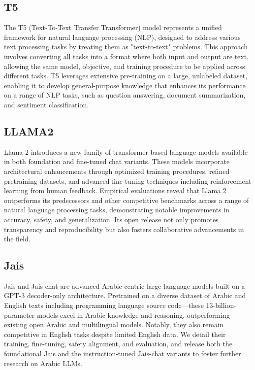 \subsection{T5}
The T5 (Text-To-Text Transfer Transformer) model represents a unified framework for natural language processing (NLP), designed to address various text processing tasks by treating them as "text-to-text" problems. This approach involves converting all tasks into a format where both input and output are text, allowing the same model, objective, and training procedure to be applied across different tasks. T5 leverages extensive pre-training on a large, unlabeled dataset, enabling it to develop general-purpose knowledge that enhances its performance on a range of NLP tasks, such as question answering, document summarization, and sentiment classification\cite{raffel2023exploring}.
\subsection{LLAMA2}
Llama 2 introduces a new family of transformer-based language models available in both foundation and fine-tuned chat variants. These models incorporate architectural enhancements through optimized training procedures, refined pretraining datasets, and advanced fine-tuning techniques including reinforcement learning from human feedback. Empirical evaluations reveal that Llama 2 outperforms its predecessors and other competitive benchmarks across a range of natural language processing tasks, demonstrating notable improvements in accuracy, safety, and generalization. Its open release not only promotes transparency and reproducibility but also fosters collaborative advancements in the field\cite{touvron2023llama2openfoundation}.

\subsection{Jais}
Jais and Jais-chat are advanced Arabic-centric large language models built on a GPT-3 decoder-only architecture. Pretrained on a diverse dataset of Arabic and English texts including programming language source code—these 13-billion-parameter models excel in Arabic knowledge and reasoning, outperforming existing open Arabic and multilingual models. Notably, they also remain competitive in English tasks despite limited English data. We detail their training, fine-tuning, safety alignment, and evaluation, and release both the foundational Jais and the instruction-tuned Jais-chat variants to foster further research on Arabic LLMs\cite{sengupta2023jaisjaischatarabiccentricfoundation}.

